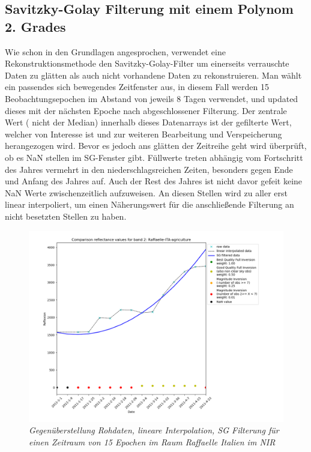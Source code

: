 \documentclass[11pt]{report}
\begin{document}
\subsection{Savitzky-Golay Filterung mit einem Polynom 2. Grades}
Wie schon in den Grundlagen angesprochen, verwendet eine Rekonstruktionsmethode den Savitzky-Golay-Filter um einerseits verrauschte Daten zu glätten als auch nicht vorhandene Daten zu rekonstruieren. Man wählt ein passendes sich bewegendes Zeitfenster aus, in diesem Fall werden 15 Beobachtungsepochen im Abstand von jeweils 8 Tagen verwendet, und updated dieses mit der nächsten Epoche nach abgeschlossener Filterung. Der zentrale Wert ( nicht der Median) innerhalb dieses Datenarrays ist der gefilterte Wert, welcher von Interesse ist und zur weiteren Bearbeitung und Verspeicherung herangezogen wird. Bevor es jedoch ans glätten der Zeitreihe geht wird überprüft, ob es NaN stellen im SG-Fenster gibt. Füllwerte treten abhängig vom Fortschritt des Jahres vermehrt in den niederschlagsreichen Zeiten, besonders gegen Ende und Anfang des Jahres auf. Auch der Rest des Jahres ist nicht davor gefeit keine NaN Werte zwischenzeitlich aufzuweisen. An diesen Stellen wird zu aller erst linear interpoliert, um einen Näherungswert für die anschließende Filterung an nicht besetzten Stellen zu haben. 
\begin{figure}[H]
\includegraphics[scale=0.6]{./Grafiken/Fitting/Fitting_method_comparison/comparison_reflectance_values_for_band_2_Raffaelle_ITA_agriculture_1_050_025_001.png}
\caption{\textit{Gegenüberstellung Rohdaten, lineare Interpolation, SG Filterung für einen Zeitraum von 15 Epochen im Raum Raffaelle Italien im NIR}}
\label{fig:compare_fit_sg_raf_it_2011}
\end{figure}
\end{document}
